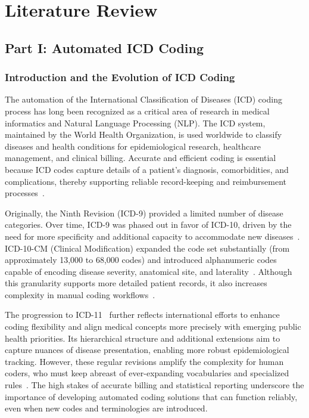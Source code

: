\chapter{Literature Review}\label{chap:litreview}

\section{Part I: Automated ICD Coding}\label{sec:p1:icd-lit}

\subsection{Introduction and the Evolution of ICD Coding}\label{sec:p1:icd-evolution}

The automation of the International Classification of Diseases (ICD) coding process has long been recognized as a critical area of research in medical informatics and Natural Language Processing (NLP). The ICD system, maintained by the World Health Organization, is used worldwide to classify diseases and health conditions for epidemiological research, healthcare management, and clinical billing. Accurate and efficient coding is essential because ICD codes capture details of a patient's diagnosis, comorbidities, and complications, thereby supporting reliable record-keeping and reimbursement processes~\citep{who2019icd11}.

Originally, the Ninth Revision (ICD-9) provided a limited number of disease categories. Over time, ICD-9 was phased out in favor of ICD-10, driven by the need for more specificity and additional capacity to accommodate new diseases~\citep{dong2022automated}. ICD-10-CM (Clinical Modification) expanded the code set substantially (from approximately 13,000 to 68,000 codes) and introduced alphanumeric codes capable of encoding disease severity, anatomical site, and laterality~\citep{edin2023automated}. Although this granularity supports more detailed patient records, it also increases complexity in manual coding workflows~\citep{farkas2008automatic}.

The progression to ICD-11~\citep{who2019icd11} further reflects international efforts to enhance coding flexibility and align medical concepts more precisely with emerging public health priorities. Its hierarchical structure and additional extensions aim to capture nuances of disease presentation, enabling more robust epidemiological tracking. However, these regular revisions amplify the complexity for human coders, who must keep abreast of ever-expanding vocabularies and specialized rules~\citep{scheurwegs2017data}. The high stakes of accurate billing and statistical reporting underscore the importance of developing automated coding solutions that can function reliably, even when new codes and terminologies are introduced.

